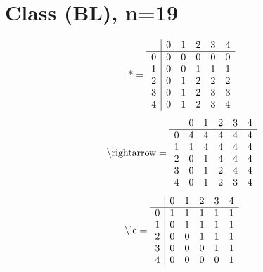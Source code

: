 \documentclass[11pt]{article}
\begin{document}
\section{Class (BL), n=19}
\[\text{*} = 
\begin{array}{r | r r r r r}
 & 0 & 1 & 2 & 3 & 4 \\ \hline
0 & 0 & 0 & 0 & 0 & 0 \\
1 & 0 & 0 & 1 & 1 & 1 \\
2 & 0 & 1 & 2 & 2 & 2 \\
3 & 0 & 1 & 2 & 3 & 3 \\
4 & 0 & 1 & 2 & 3 & 4 \\
\end{array}
\]
\[\text{\textbackslash rightarrow} = 
\begin{array}{r | r r r r r}
 & 0 & 1 & 2 & 3 & 4 \\ \hline
0 & 4 & 4 & 4 & 4 & 4 \\
1 & 1 & 4 & 4 & 4 & 4 \\
2 & 0 & 1 & 4 & 4 & 4 \\
3 & 0 & 1 & 2 & 4 & 4 \\
4 & 0 & 1 & 2 & 3 & 4 \\
\end{array}
\]
\[\text{\textbackslash le} = 
\begin{array}{r | r r r r r}
 & 0 & 1 & 2 & 3 & 4 \\ \hline
0 & 1 & 1 & 1 & 1 & 1 \\
1 & 0 & 1 & 1 & 1 & 1 \\
2 & 0 & 0 & 1 & 1 & 1 \\
3 & 0 & 0 & 0 & 1 & 1 \\
4 & 0 & 0 & 0 & 0 & 1 \\
\end{array}
\]
\end{document}
